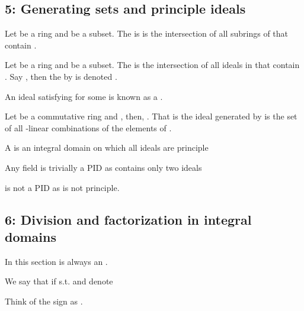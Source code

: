 \begin{Le}
\subsection{5: Generating sets and principle ideals}
\begin{D} Let  be a ring and  be a subset. The   is is the intersection of all subrings of  that contain .\end{D}
\begin{D} Let  be a ring and  be a subset. The   is the intersection of all ideals in  that contain . Say , then the  by  is denoted .\end{D}


\begin{D} An ideal  satisfying  for some  is known as a . \end{D}

\begin{Le} Let  be a commutative ring and , then, 
. That is the ideal generated by  is the set of all -linear combinations of the elements of .\end{Le}

\begin{D} A  is an integral domain on which all ideals are principle \end{D} 

\begin{R} Any field  is trivially a PID as  contains only two ideals  \end{R}
\begin{R}  is not a PID as  is not principle. \end{R}


\subsection{6: Division and factorization in integral domains}
In this section  is always an .

\begin{D} We say that    if  s.t.  and denote  \end{D} 
\begin{R} Think of the \e{$|$} sign as . \end{R}


\end{Le}
